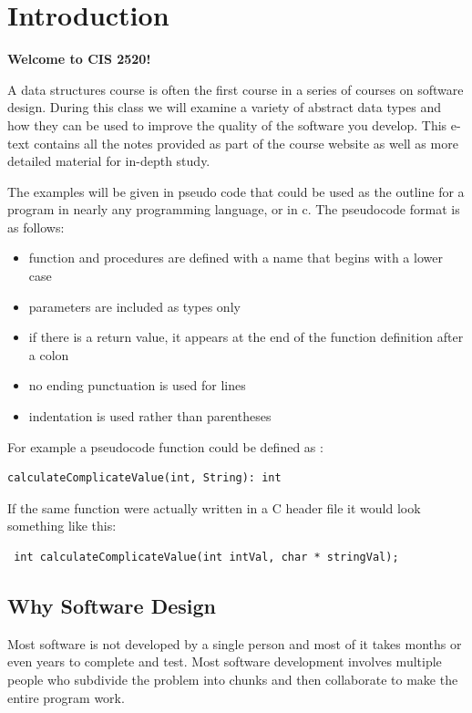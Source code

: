 \chapter{Introduction}

\textbf{Welcome to CIS 2520!}

A data structures course is often the first course in a series of courses on software design.  
During this class we will examine a variety of abstract data types and how they can be used to improve the quality of the software you develop. This e-text contains all the notes provided as part of the course website as well as more detailed material for in-depth study.  
 
The examples will be given in pseudo code that could be used as the outline for a program in nearly any programming language, or in c.   The pseudocode format is as follows:  

\begin{itemize}
\item function and procedures are defined with a name that begins with a lower case 
\item parameters are included as types only 
\item if there is a return value,   it appears at the end of the function definition after a colon
\item no ending punctuation is used for lines
\item indentation is used rather than parentheses  
\end{itemize} 
For example a pseudocode function could be defined as :    

\begin{lstlisting}
calculateComplicateValue(int, String): int
\end{lstlisting}
 If the same function were actually written in a C header file it would look something like this:  
 \begin{lstlisting}
 int calculateComplicateValue(int intVal, char * stringVal);
 \end{lstlisting} 
\section{Why Software Design}

Most software is not developed by a single person and most of it takes months or even years to complete and test.   Most software development involves multiple people who subdivide the problem into chunks and then collaborate to make the entire program work.
 
